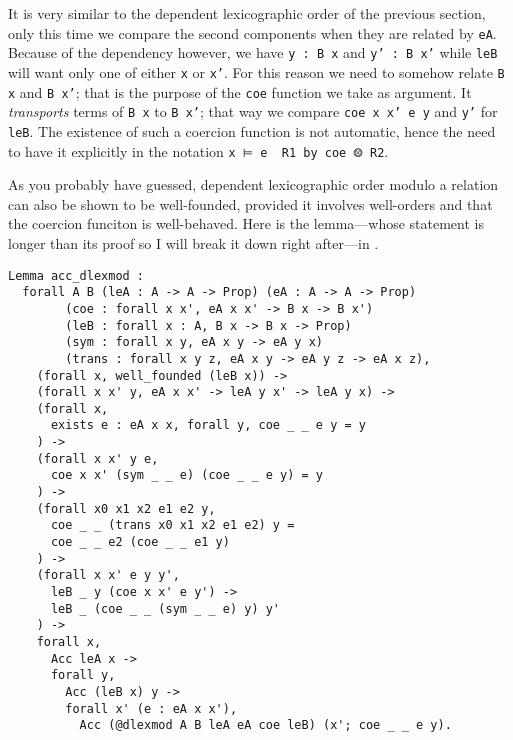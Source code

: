 It is very similar to the dependent lexicographic order of the previous section,
only this time we compare the second components when they are related by
\texttt{eA}. Because of the dependency however, we have
\texttt{y : B x} and \texttt{y' : B x'} while
\texttt{leB} will want only one of either \texttt{x} or
\texttt{x'}.
For this reason we need to somehow relate \texttt{B x} and
\texttt{B x'}; that is the purpose of the \texttt{coe}
function we take as argument. It \emph{transports} terms of
\texttt{B x} to \texttt{B x'}; that way we compare
\texttt{coe x x' e y} and \texttt{y'} for
\texttt{leB}.
The existence of such a coercion function is not automatic, hence the need to
have it explicitly in the notation \texttt{x ⊨ e \ R1 by coe ⨷ R2}.

As you probably have guessed, dependent lexicographic order modulo a relation
can also be shown to be well-founded, provided it involves well-orders and that
the coercion funciton is well-behaved.
Here is the lemma---whose statement is longer than its proof so I will break it
down right after---in \Coq.
\begin{verbatim}
Lemma acc_dlexmod :
  forall A B (leA : A -> A -> Prop) (eA : A -> A -> Prop)
        (coe : forall x x', eA x x' -> B x -> B x')
        (leB : forall x : A, B x -> B x -> Prop)
        (sym : forall x y, eA x y -> eA y x)
        (trans : forall x y z, eA x y -> eA y z -> eA x z),
    (forall x, well_founded (leB x)) ->
    (forall x x' y, eA x x' -> leA y x' -> leA y x) ->
    (forall x,
      exists e : eA x x, forall y, coe _ _ e y = y
    ) ->
    (forall x x' y e,
      coe x x' (sym _ _ e) (coe _ _ e y) = y
    ) ->
    (forall x0 x1 x2 e1 e2 y,
      coe _ _ (trans x0 x1 x2 e1 e2) y =
      coe _ _ e2 (coe _ _ e1 y)
    ) ->
    (forall x x' e y y',
      leB _ y (coe x x' e y') ->
      leB _ (coe _ _ (sym _ _ e) y) y'
    ) ->
    forall x,
      Acc leA x ->
      forall y,
        Acc (leB x) y ->
        forall x' (e : eA x x'),
          Acc (@dlexmod A B leA eA coe leB) (x'; coe _ _ e y).
\end{verbatim}

